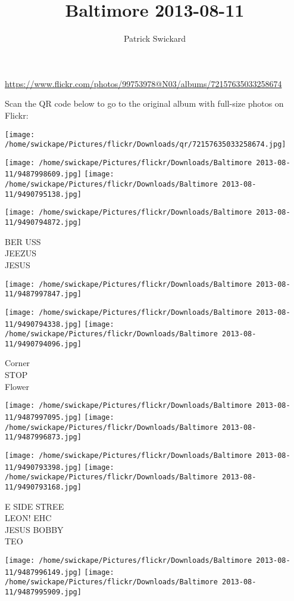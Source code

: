 \documentclass[10pt,letterpaper]{article}
\title{Baltimore 2013-08-11}
\author{Patrick Swickard}
\date{}
\begin{document}
\maketitle

\url{https://www.flickr.com/photos/99753978@N03/albums/72157635033258674}

Scan the QR code below to go to the original album with full-size photos on Flickr:

\texttt{[image: /home/swickape/Pictures/flickr/Downloads/qr/72157635033258674.jpg]}
\pagebreak

\texttt{[image: /home/swickape/Pictures/flickr/Downloads/Baltimore 2013-08-11/9487998609.jpg]}
\texttt{[image: /home/swickape/Pictures/flickr/Downloads/Baltimore 2013-08-11/9490795138.jpg]}

\texttt{[image: /home/swickape/Pictures/flickr/Downloads/Baltimore 2013-08-11/9490794872.jpg]}

BER USS\\
JEEZUS\\
JESUS
\pagebreak

\texttt{[image: /home/swickape/Pictures/flickr/Downloads/Baltimore 2013-08-11/9487997847.jpg]}

\vspace{0.25in}
\texttt{[image: /home/swickape/Pictures/flickr/Downloads/Baltimore 2013-08-11/9490794338.jpg]}
\texttt{[image: /home/swickape/Pictures/flickr/Downloads/Baltimore 2013-08-11/9490794096.jpg]}

Corner\\
STOP\\
Flower
\pagebreak

\texttt{[image: /home/swickape/Pictures/flickr/Downloads/Baltimore 2013-08-11/9487997095.jpg]}
\texttt{[image: /home/swickape/Pictures/flickr/Downloads/Baltimore 2013-08-11/9487996873.jpg]}

\texttt{[image: /home/swickape/Pictures/flickr/Downloads/Baltimore 2013-08-11/9490793398.jpg]}
\texttt{[image: /home/swickape/Pictures/flickr/Downloads/Baltimore 2013-08-11/9490793168.jpg]}

E SIDE STREE\\
LEON! EHC\\
JESUS BOBBY\\
TEO
\pagebreak

\texttt{[image: /home/swickape/Pictures/flickr/Downloads/Baltimore 2013-08-11/9487996149.jpg]}
\texttt{[image: /home/swickape/Pictures/flickr/Downloads/Baltimore 2013-08-11/9487995909.jpg]}
\end{document}
